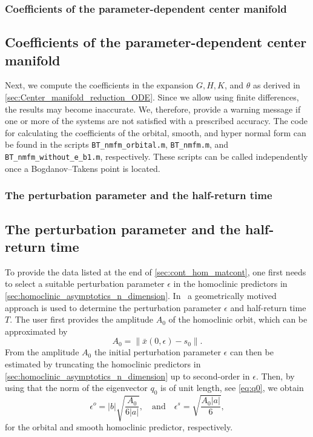 \ifthesis
\subsubsection{Coefficients of the parameter-dependent center manifold}
\else
\subsection{Coefficients of the parameter-dependent center manifold}
\fi
Next, we compute the coefficients in the expansion $G, H, K$, and $\theta$ as
derived in \cref{sec:Center_manifold_reduction_ODE}. Since we allow
using finite differences, the results may become inaccurate. We, therefore,
provide a warning message if one or more of the systems are not satisfied with
a prescribed accuracy. The code for calculating the coefficients of the
orbital, smooth, and hyper normal form can be found in the scripts
\texttt{BT_nmfm_orbital.m}, \texttt{BT_nmfm.m}, and
\texttt{BT_nmfm_without_e_b1.m}, respectively. These scripts can be
called independently once a Bogdanov--Takens point is located.

\ifthesis
\subsubsection{The perturbation parameter and the half-return time}
\else
\subsection{The perturbation parameter and the half-return time}
\fi
To provide the data listed at the end of \cref{sec:cont_hom_matcont}, one first
needs to select a suitable perturbation parameter $\epsilon$ in the homoclinic
predictors in \cref{sec:homoclinic_asymptotics_n_dimension}.
In~\cite{Al-Hdaibat2016} a geometrically motived approach is used to determine
the perturbation parameter $\epsilon$ and half-return time $T$. The user first
provides the amplitude $A_0$ of the homoclinic orbit, which can be approximated
by
\begin{equation*}
    A_0 = \|\bar x(0,\epsilon)-s_0\|.
\end{equation*}
From the amplitude $A_0$ the initial perturbation parameter $\epsilon$ can then
be estimated by truncating the homoclinic predictors in
\cref{sec:homoclinic_asymptotics_n_dimension} up to second-order in $\epsilon$.
Then, by using that the norm of the eigenvector $q_0$ is of unit length, see
\cref{eq:q0}, we obtain
 \[
     \epsilon^o  = |b|\sqrt{ \frac{A_0}{6|a|}},
     \quad \mbox{and} \quad 
     \epsilon^s  = \sqrt{ \frac{A_0|a|}{6}},
\] 
for the orbital and smooth homoclinic predictor, respectively.

